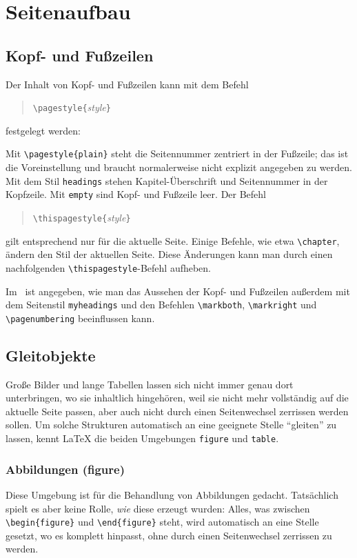 \section{Seitenaufbau}

\subsection{Kopf- und Fußzeilen} 
Der Inhalt von Kopf- und  Fußzeilen kann mit dem Befehl
\begin{verse}
\verb|\pagestyle{|\textit{style}\verb|}|
\end{verse}
festgelegt werden:
 
Mit \verb|\pagestyle{plain}| steht
die Seitennummer zentriert in der Fußzeile; 
das ist die Voreinstellung und braucht normalerweise nicht explizit 
angegeben zu werden.
Mit dem Stil \texttt{headings} stehen Kapitel-Überschrift und
Seitennummer in der Kopfzeile.
Mit \texttt{empty} sind Kopf- und Fußzeile leer.  Der Befehl
\begin{verse}
\verb|\thispagestyle{|\textit{style}\verb|}|
\end{verse}
gilt entsprechend nur für die aktuelle Seite.  Einige Befehle, wie etwa
\verb|\chapter|, ändern den Stil der aktuellen Seite.  Diese Änderungen 
kann man durch einen nachfolgenden \verb|\thispagestyle|-Befehl aufheben.

Im \manual\ ist angegeben, wie man das Aussehen der Kopf- und Fußzeilen
außerdem mit dem Seitenstil 
\verb|myheadings| und den Befehlen
\verb|\markboth|,
\verb|\markright| und
\verb|\pagenumbering|
beeinflussen kann.

\subsection{Gleitobjekte} \label{floats}
Große Bilder und lange Tabellen lassen sich nicht immer genau 
dort unterbringen, wo sie inhaltlich hingehören, weil sie nicht mehr 
vollständig auf die aktuelle Seite passen, aber auch nicht durch einen 
Seitenwechsel zerrissen werden sollen.  Um  solche Strukturen automatisch
an eine geeignete Stelle "`gleiten"' zu lassen, kennt \LaTeX{} die beiden 
Umgebungen \texttt{figure} und \texttt{table}.  

\subsubsection{Abbildungen (figure)}
Diese Umgebung ist für die Behandlung von Abbildungen gedacht.
Tatsächlich spielt es aber keine Rolle, \emph{wie} diese erzeugt wurden:
Alles, was zwischen
\verb|\begin{figure}| und \verb|\end{figure}|
steht, wird automatisch an eine Stelle
gesetzt, wo es komplett hinpasst, ohne durch einen Seitenwechsel
zerrissen zu werden.  

